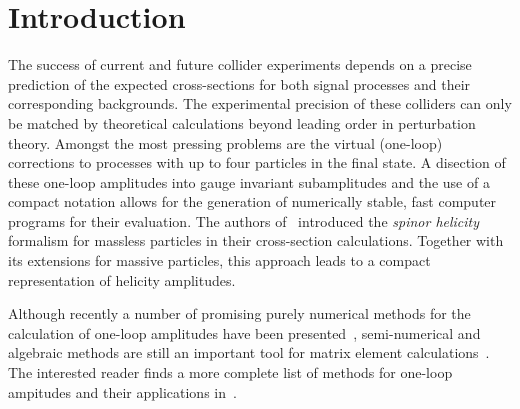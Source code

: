 \documentclass[preprint,number,12pt,sort&compress]{elsarticle}
\begin{document}
\section{Introduction}
The success of current and future collider experiments depends on a precise
prediction of the expected cross-sections for both signal processes and
their corresponding backgrounds. The experimental precision of these
colliders can only be matched by theoretical calculations beyond leading 
order in perturbation theory. Amongst the most pressing problems are
the virtual (one-loop) corrections to processes with up to four particles
in the final state.
A disection of these one-loop amplitudes into
gauge invariant subamplitudes and the use of a compact notation
allows for the generation of numerically stable, fast
computer programs for their evaluation. The authors of~\cite{Xu:1987}
introduced the \emph{spinor helicity} formalism for massless particles
in their cross-section calculations. Together with its extensions for
massive particles, this approach leads to a compact representation
of helicity amplitudes.

Although recently a number of promising purely numerical methods
for the calculation of one-loop amplitudes have been
presented~\cite{Berger:2008ag,Berger:2009zg,Berger:2009ep,Berger:2010vm,%
Giele:2008bc,Ellis:2008ir,Ellis:2009zw,KeithEllis:2009bu,%
Bevilacqua:2009zn,Bevilacqua:2010ve,%
vanHameren:2009dr,VanHameren:2009vq,Ossola:2006us,Mastrolia:2010nb,
Melia:2010bm},
semi-nu\-me\-ri\-cal and algebraic methods are still an important tool
for matrix element
calculations~\cite{%
Denner:2005nn,Denner:2005fg,Bredenstein:2009aj,Bredenstein:2010rs,%
Binoth:2009rv,%
Britto:2004nc,Britto:2006sj,Mastrolia:2006ki,Forde:2007mi,%
BjerrumBohr:2007vu,Kilgore:2007qr,Badger:2008cm,%
Mastrolia:2009dr,Mastrolia:2009rk,%
Berger:2006sh,Badger:2006us,Badger:2007si,Glover:2008ffa,Badger:2009hw,%
Dixon:2009uk,Badger:2009vh}.
The interested reader finds a more complete list of methods for one-loop
ampitudes and their applications in~\cite{Binoth:2010ra,Bern:2008ef}.
\end{document}
